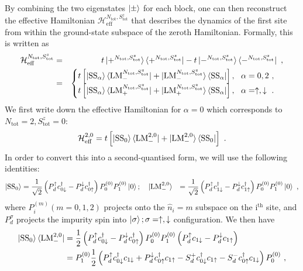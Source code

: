 \documentclass{iopart}
\begin{document}
By combining the two eigenstates \(\ket{\pm}\) for each block, one can then reconstruct the effective Hamiltonian \(\mathcal{H}^{N_\text{tot}, S_\text{tot}^z}_\text{eff}\) that describes the dynamics of the first site from within the ground-state subspace of the zeroth Hamiltonian. Formally, this is written as
\begin{eqnarray}
	\label{eff-ham-all}
	\mathcal{H}^{N_\text{tot}, S_\text{tot}^z}_\text{eff} &=& t\ket{+^{N_\text{tot}, S_\text{tot}^z}}\bra{+^{N_\text{tot}, S_\text{tot}^z}} - t\ket{-^{N_\text{tot}, S_\text{tot}^z}}\bra{-^{N_\text{tot}, S_\text{tot}^z}}~, \nonumber\\
							      &=& \begin{cases} t \left[\ket{\text{SS}_\alpha}\bra{\text{LM}_-^{N_\text{tot}, S_\text{tot}^z}} + \ket{\text{LM}_-^{N_\text{tot}, S_\text{tot}^z}}\bra{\text{SS}_\alpha}\right], ~ ~ \alpha=0,2~,\\
	t \left[\ket{\text{SS}_\alpha}\bra{\text{LM}_+^{N_\text{tot}, S_\text{tot}^z}} + \ket{\text{LM}_+^{N_\text{tot}, S_\text{tot}^z}}\bra{\text{SS}_\alpha}\right], ~ ~ \alpha=\uparrow, \downarrow~.\\
        \end{cases}
\end{eqnarray}
We first write down the effective Hamiltonian for \(\alpha=0\) which corresponds to \(N_\text{tot}=2, S_\text{tot}^z = 0\):
\begin{eqnarray}
	\mathcal{H}^{2, 0}_\text{eff} = t \left[\ket{\text{SS}_0}\bra{\text{LM}_-^{2,0}} + \ket{\text{LM}_-^{2,0}}\bra{\text{SS}_0}\right] ~.
\end{eqnarray}
In order to convert this into a second-quantised form, we will use the following identities:
\begin{eqnarray}
	\ket{\text{SS}_0} &= \frac{1}{\sqrt 2}\left(P_d^{ \uparrow} c^\dagger_{0 \downarrow} - P_d^{ \downarrow} c^\dagger_{0 \uparrow} \right) P_0^{(0)}P_1^{(0)}\ket{0}; \quad \ket{\text{LM}_-^{2,0}} &= \frac{1}{\sqrt 2}\left(P_d^{ \uparrow} c^\dagger_{1 \downarrow} - P_d^{ \downarrow} c^\dagger_{1 \uparrow} \right) P_0^{(0)}P_1^{(0)}\ket{0}~,
\end{eqnarray}
where \(P_i^{(m)} (m=0,1,2)\) projects onto the \(\hat n_i = m\) subspace on the i\(^\text{th}\) site, and \(P_d^\sigma\) projects the impurity spin into \(\ket{\sigma};\sigma=\uparrow,\downarrow\) configuration.
We then have
\begin{eqnarray}
	\ket{\text{SS}_0} \bra{\text{LM}_-^{2,0}} &= \frac{1}{2}\left(P_d^{\uparrow} c^\dagger_{0 \downarrow} - P_{d}^{\downarrow} c^\dagger_{0 \uparrow} \right)P_0^{(0)}P_1^{(0)}\left(P_{d}^{\uparrow} c_{1 \downarrow} - P_{d}^{\downarrow} c_{1 \uparrow} \right)\nonumber \\
						  &= P_1^{(0)}\frac{1}{2}\left(P_d^\uparrow c^\dagger_{0 \downarrow}c_{1 \downarrow} + P_d^\downarrow c^\dagger_{0 \uparrow}c_{1 \uparrow} - S_d^+ c^\dagger_{0 \downarrow} c_{1 \uparrow} - S_d^- c^\dagger_{ 0 \uparrow} c_{1 \downarrow}\right)P_0^{(0)}~,
\end{eqnarray}
\end{document}
